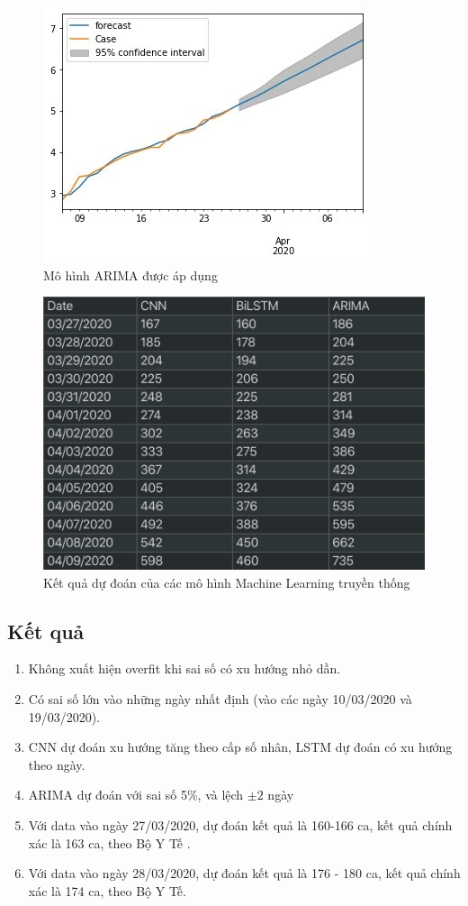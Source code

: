 ﻿\documentclass{article}
\begin{document}
    \begin{figure}
    \centering
    \includegraphics[scale=0.5]{arima.jpg}
    \caption{Mô hình ARIMA được áp dụng}
    \label{fig:arima}
    \end{figure}
    
    \begin{figure}
    \centering
    \includegraphics[scale=0.25]{data.png}
    \caption{Kết quả dự đoán của các mô hình Machine Learning truyền thống}
    \label{fig:mldata}
    \end{figure}
    
\subsection{Kết quả}

\begin{enumerate}
    \item Không xuất hiện overfit khi sai số có xu hướng nhỏ dần.
    \item Có sai số lớn vào những ngày nhất định (vào các ngày 10/03/2020 và 19/03/2020).
    \item CNN dự đoán xu hướng tăng theo cấp số nhân, LSTM dự đoán có xu hướng theo ngày.
    \item ARIMA dự đoán với sai số 5\%, và lệch $\pm 2$ ngày 
    \item Với data vào ngày 27/03/2020, dự đoán kết quả là 160-166 ca, kết quả chính xác là 163 ca, theo Bộ Y Tế \cite{govcov}.
    \item Với data vào ngày 28/03/2020, dự đoán kết quả là 176 - 180 ca, kết quả chính xác là 174 ca, theo Bộ Y Tế.
\end{enumerate}
\end{document}
